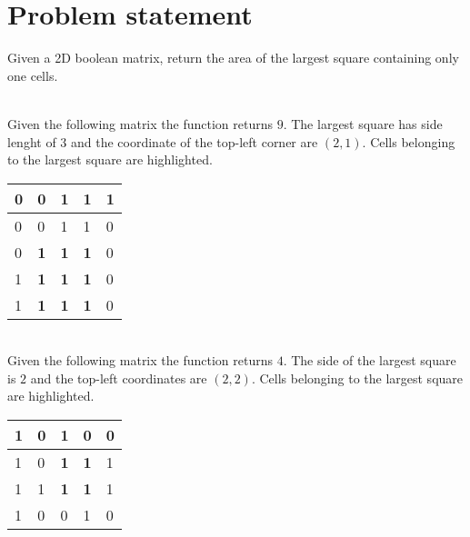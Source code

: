 \section{Problem statement}
\begin{exercise}
Given a 2D boolean matrix, return the area of the largest square containing only one cells.
	\begin{example}
		\hfill \\
		Given the following matrix the function returns $9$. The largest square has side lenght of
		$3$ and the coordinate of the top-left corner are $(2,1)$. Cells belonging to the largest
		square are highlighted.

		\begin{tabular}{|l|l|l|l|l|}
		\hline
		0 & 0                                  & 1                                  & 1 & 1 \\
		\hline
		0 & 0                                  & 1                                  & 1 & 0 \\
		\hline
		0 & \cellcolor[HTML]{32CB00}\textbf{1} & \cellcolor[HTML]{32CB00}\textbf{1} &
		\cellcolor[HTML]{32CB00}\textbf{1} & 0 \\ \hline
		1 & \cellcolor[HTML]{32CB00}\textbf{1} & \cellcolor[HTML]{32CB00}\textbf{1} &
		\cellcolor[HTML]{32CB00}\textbf{1} & 0 \\ \hline
		1 & \cellcolor[HTML]{32CB00}\textbf{1} & \cellcolor[HTML]{32CB00}\textbf{1} &
		\cellcolor[HTML]{32CB00}\textbf{1} & 0 \\ \hline
		\end{tabular}
		
	\end{example}

	\begin{example}
		\hfill \\
		Given the following matrix the function returns $4$. The side of the largest square is $2$
		and the top-left coordinates are $(2,2)$. Cells belonging to the largest square are
		highlighted.
		\begin{tabular}{|l|l|l|l|l|}
		\hline
		1 & 0 & 1                                  & 0                                  & 0 \\
		\hline
		1 & 0 & \cellcolor[HTML]{32CB00}\textbf{1} & \cellcolor[HTML]{32CB00}\textbf{1} & 1 \\
		\hline
		1 & 1 & \cellcolor[HTML]{32CB00}\textbf{1} & \cellcolor[HTML]{32CB00}\textbf{1} & 1 \\
		\hline
		1 & 0 & 0                                  & 1                                  & 0 \\
		\hline
\end{tabular}

	\end{example}

\end{exercise}


